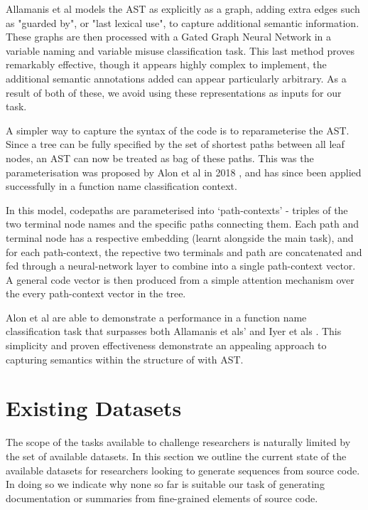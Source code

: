 Allamanis et al models the AST as explicitly as a graph, adding extra edges such as "guarded by", or "last lexical use", to capture additional semantic information\cite{allamanis_learning_2017}. These graphs are then processed with a Gated Graph Neural Network in a variable naming and variable misuse classification task. 
This last method proves remarkably effective, though it appears highly complex to implement, the additional semantic annotations added can appear particularly arbitrary. As a result of both of these, we avoid using these representations as inputs for our task.

A simpler way to capture the syntax of the code is to reparameterise the AST.
Since a tree can be fully specified by the set of shortest paths between all leaf nodes, an AST can now be treated as bag of these paths. This was the parameterisation was proposed by Alon et al in 2018 \cite{alon_general_2018}, and has since been applied successfully in a function name classification context\cite{alon_code2vec_2018}.

In this model, codepaths are parameterised into `path-contexts' - triples of the two terminal node names and the specific paths connecting them.
Each path and terminal node has a respective embedding (learnt alongside the main task), and for each path-context, the repective two terminals and path are concatenated and fed through a neural-network layer to combine into a single path-context vector.
A general code vector is then produced from a simple attention mechanism over the every path-context vector in the tree. 


Alon et al are able to demonstrate a performance in a function name classification task that surpasses both Allamanis et als' \cite{allamanis_convolutional_2016} and Iyer et als \cite{iyer_summarizing_2016}. This simplicity and proven effectiveness demonstrate an appealing approach to capturing semantics within the structure of with AST.

\section{Existing Datasets}
\label{sec:existing_datasets}

The scope of the tasks available to challenge researchers is naturally limited by the set of available datasets.
In this section we outline the current state of the available datasets for researchers looking to generate sequences from source code. In doing so we indicate why none so far is suitable our task of generating documentation or summaries from fine-grained elements of source code.

